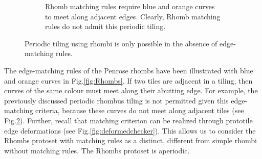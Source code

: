 \documentclass[
  oneside,
  11pt, a4paper,
  footinclude=true,
  headinclude=true,
  cleardoublepage=empty
]{scrbook}
\begin{document}
\begin{figure}[H]
\begin{subfigure}[t]{0.45\textwidth}
\caption{Rhomb matching rules require blue and orange curves to meet along adjacent edges. Clearly, Rhomb matching rules do not admit this periodic tiling.}
\label{fig:RhombsPeriodicRules}
\end{subfigure}
\caption[Rhomb Matching Rules Forcing Aperiodicity]{Periodic tiling using rhombi is only possible in the absence of edge-matching rules.}
\end{figure}
The edge-matching rules of the Penrose rhombs have been illustrated with blue and orange curves in Fig.\ref{fig:Rhombs}. If two tiles are adjacent in a tiling, then curves of the same colour must meet along their abutting edge. For example, the previously discussed periodic rhombus tiling is not permitted given this edge-matching criteria, because these curves do not meet along adjacent tiles (see Fig.\ref{fig:RhombsPeriodicRules}). Further, recall that matching criterion can be realized through prototile edge deformations (see Fig.\ref{fig:deformedchecker}). This allows us to consider the Rhombs protoset with matching rules as a distinct, different from simple rhombi without matching rules. The Rhombs protoset is aperiodic. 
\end{document}
